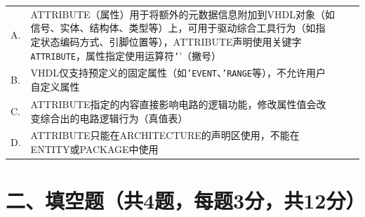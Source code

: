 \begin{enumerate}[label=\arabic*.]
\begin{tabular}{@{}lp{}@{\qquad}lp{}@{}}
A. & ATTRIBUTE（属性）用于将额外的元数据信息附加到VHDL对象（如信号、实体、结构体、类型等）上，可用于驱动综合工具行为（如指定状态编码方式、引脚位置等），ATTRIBUTE声明使用关键字\texttt{ATTRIBUTE}，属性指定使用运算符\texttt{'}'（撇号） \\
B. & VHDL仅支持预定义的固定属性（如\texttt{'EVENT}、\texttt{'RANGE}等），不允许用户自定义属性 \\
C. & ATTRIBUTE指定的内容直接影响电路的逻辑功能，修改属性值会改变综合出的电路逻辑行为（真值表） \\
D. & ATTRIBUTE只能在ARCHITECTURE的声明区使用，不能在ENTITY或PACKAGE中使用 \\
\end{tabular}

\vspace{0.3cm}

\end{enumerate}

\newpage

\section*{二、填空题（共4题，每题3分，共12分）}

